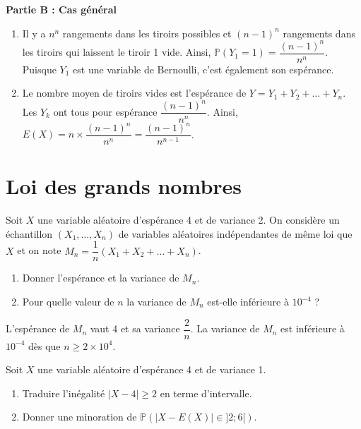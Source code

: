 \documentclass[11pt,fleqn, openany]{book} %
\begin{document}
\begin{solution}
\textbf{Partie B : Cas général}

\begin{enumerate}
\item Il y a $n^n$ rangements dans les tiroirs possibles et $(n-1)^n$ rangements dans les tiroirs qui laissent le tiroir 1 vide. Ainsi, $\mathbb{P}(Y_1=1)=\dfrac{(n-1)^n}{n^n}$. Puisque $Y_1$ est une variable de Bernoulli, c'est également son espérance.
\item Le nombre moyen de tiroirs vides est l'espérance de $Y=Y_1+Y_2+\ldots + Y_n$. Les $Y_k$ ont tous pour espérance $\dfrac{(n-1)^n}{n^n}$. Ainsi, $E(X)=n \times \dfrac{(n-1)^n}{n^n}=\dfrac{(n-1)^n}{n^{n-1}}$.
\end{enumerate}

\end{solution}



\section*{Loi des grands nombres}


\begin{exercise}Soit $X$ une variable aléatoire d'espérance 4 et de variance 2. On considère un échantillon $(X_1, \ldots, X_n)$ de variables aléatoires indépendantes de même loi que $X$ et on note $M_n = \dfrac{1}{n} (X_1+X_2+\ldots + X_n)$.
\begin{enumerate}
\item Donner l'espérance et la variance de $M_n$.
\item Pour quelle valeur de $n$ la variance de $M_n$ est-elle inférieure à $10^{-4}$ ?
\end{enumerate}
\end{exercise}

\begin{solution}L'espérance de $M_n$ vaut 4 et sa variance $\dfrac{2}{n}$.
La variance de $M_n$ est inférieure à $10^{-4}$ dès que $n\geqslant 2 \times 10^{4}$.\end{solution}



\begin{exercise}Soit $X$ une variable aléatoire d'espérance 4 et de variance 1. 
\begin{enumerate}
\item Traduire l'inégalité $|X-4|\geqslant 2$ en terme d'intervalle.
\item Donner une minoration de $\mathbb{P}(|X-E(X)| \in ]2;6[)$.
\end{enumerate}
\end{exercise}
\end{document}
